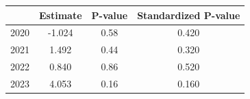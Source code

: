 \begin{tabular}{lccc}
\hline
 & Estimate & P-value & Standardized P-value \\
\hline
2020 & -1.024 & 0.58 & 0.420 \\
2021 & 1.492 & 0.44 & 0.320 \\
2022 & 0.840 & 0.86 & 0.520 \\
2023 & 4.053 & 0.16 & 0.160 \\
\hline
\end{tabular}
